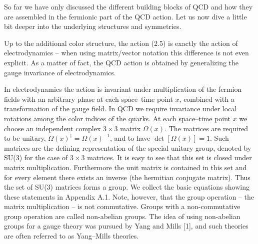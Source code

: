 So far we have only discussed the different building blocks of QCD and how
they are assembled in the fermionic part of the QCD action. Let us now dive
a little bit deeper into the underlying structures and symmetries.

Up to the additional color structure, the action (2.5) is exactly the action
of electrodynamics -- when using matrix/vector notation this difference is
not even explicit. As a matter of fact, the QCD action is obtained by
generalizing the gauge invariance of electrodynamics.

In electrodynamics the action is invariant under multiplication of the
fermion fields with an arbitrary phase at each space--time point $x$,
combined with a transformation of the gauge field. In QCD we require
invariance under local rotations among the color indices of the quarks. At
each space--time point $x$ we choose an independent complex $3 \times 3$
matrix $\Omega(x)$. The matrices are required to be unitary,
$\Omega(x)^\dagger = \Omega(x)^{-1}$, and to have $\det[\Omega(x)] = 1$.
Such matrices are the defining representation of the special unitary group,
denoted by SU(3) for the case of $3 \times 3$ matrices. It is easy to see
that this set is closed under matrix multiplication. Furthermore the unit
matrix is contained in this set and for every element there exists an
inverse (the hermitian conjugate matrix). Thus the set of SU(3) matrices
forms a group. We collect the basic equations showing these statements in
Appendix A.1. Note, however, that the group operation -- the matrix
multiplication -- is not commutative. Groups with a non-commutative group
operation are called non-abelian groups. The idea of using non-abelian
groups for a gauge theory was pursued by Yang and Mills [1], and such
theories are often referred to as Yang--Mills theories.

